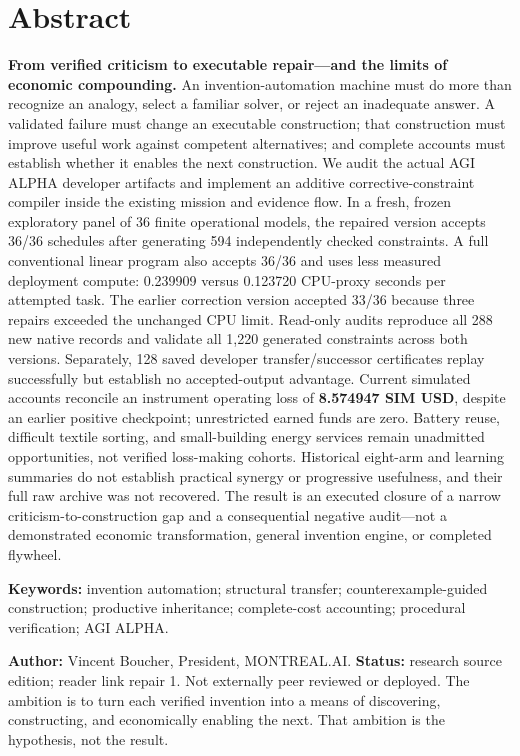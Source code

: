 \section*{Abstract}\label{abstract}

\textbf{From verified criticism to executable repair---and the limits of
economic compounding.} An invention-automation machine must do more than
recognize an analogy, select a familiar solver, or reject an inadequate
answer. A validated failure must change an executable construction; that
construction must improve useful work against competent alternatives;
and complete accounts must establish whether it enables the next
construction. We audit the actual AGI ALPHA developer artifacts and
implement an additive corrective-constraint compiler inside the existing
mission and evidence flow. In a fresh, frozen exploratory panel of 36
finite operational models, the repaired version accepts 36/36 schedules
after generating 594 independently checked constraints. A full
conventional linear program also accepts 36/36 and uses less measured
deployment compute: 0.239909 versus 0.123720 CPU-proxy seconds per
attempted task. The earlier correction version accepted 33/36 because
three repairs exceeded the unchanged CPU limit. Read-only audits
reproduce all 288 new native records and validate all 1,220 generated
constraints across both versions. Separately, 128 saved developer
transfer/successor certificates replay successfully but establish no
accepted-output advantage. Current simulated accounts reconcile an
instrument operating loss of \textbf{8.574947 SIM USD}, despite an
earlier positive checkpoint; unrestricted earned funds are zero. Battery
reuse, difficult textile sorting, and small-building energy services
remain unadmitted opportunities, not verified loss-making cohorts.
Historical eight-arm and learning summaries do not establish practical
synergy or progressive usefulness, and their full raw archive was not
recovered. The result is an executed closure of a narrow
criticism-to-construction gap and a consequential negative audit---not a
demonstrated economic transformation, general invention engine, or
completed flywheel.

\textbf{Keywords:} invention automation; structural transfer;
counterexample-guided construction; productive inheritance;
complete-cost accounting; procedural verification; AGI ALPHA.

\textbf{Author:} Vincent Boucher, President, MONTREAL.AI.
\textbf{Status:} research source edition; reader link repair 1. Not externally peer reviewed or deployed. The ambition is to turn each verified
invention into a means of discovering, constructing, and economically
enabling the next. That ambition is the hypothesis, not the result.

